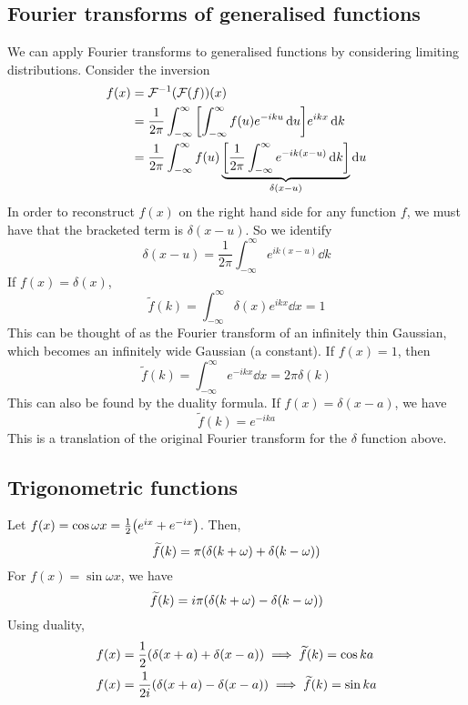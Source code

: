 \subsection{Fourier transforms of generalised functions}
We can apply Fourier transforms to generalised functions by considering limiting distributions.
Consider the inversion
\begin{align*}
	f(x) & = \mathcal F^{-1}(\mathcal F(f))(x)                                                                                                          \\
	     & = \frac{1}{2\pi} \int_{-\infty}^\infty \qty[\int_{-\infty}^\infty f(u) e^{-iku} \dd{u}] e^{ikx} \dd{k}                                       \\
	     & = \frac{1}{2\pi} \int_{-\infty}^\infty f(u) \underbrace{\qty[\frac{1}{2\pi} \int_{-\infty}^\infty e^{-ik(x-u)} \dd{k}]}_{\delta(x-u)} \dd{u}
\end{align*}
In order to reconstruct \( f(x) \) on the right hand side for any function \( f \), we must have that the bracketed term is \( \delta(x-u) \).
So we identify
\[
	\delta(x-u) = \frac{1}{2\pi} \int_{-\infty}^\infty e^{ik(x-u)} \dd{k}
\]
If \( f(x) = \delta(x) \),
\[
	\widetilde f(k) = \int_{-\infty}^\infty \delta(x) e^{ikx} \dd{x} = 1
\]
This can be thought of as the Fourier transform of an infinitely thin Gaussian, which becomes an infinitely wide Gaussian (a constant).
If \( f(x) = 1 \), then
\[
	\widetilde f(k) = \int_{-\infty}^\infty e^{-ikx}\dd{x} = 2\pi \delta(k)
\]
This can also be found by the duality formula.
If \( f(x) = \delta(x - a) \), we have
\[
	\widetilde f(k) = e^{-ika}
\]
This is a translation of the original Fourier transform for the \( \delta \) function above.

\subsection{Trigonometric functions}
Let \( f(x) = \cos \omega x = \frac{1}{2} \qty(e^{ix} + e^{-ix}) \).
Then,
\[
	\widetilde f(k) = \pi\qty(\delta(k+\omega) + \delta(k-\omega))
\]
For \( f(x) = \sin \omega x \), we have
\[
	\widetilde f(k) = i\pi\qty(\delta(k+\omega) - \delta(k-\omega))
\]
Using duality,
\begin{align*}
	f(x) & = \frac{1}{2}\qty(\delta(x+a) + \delta(x-a)) \implies \widetilde f(k) = \cos ka  \\
	f(x) & = \frac{1}{2i}\qty(\delta(x+a) - \delta(x-a)) \implies \widetilde f(k) = \sin ka
\end{align*}

